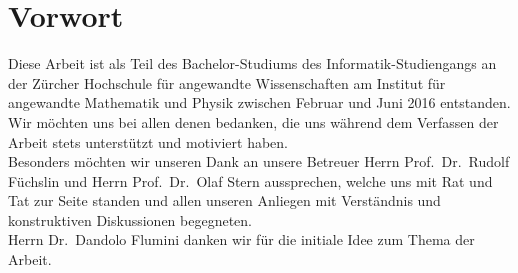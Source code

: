 %
%


\chapter{Vorwort}

  Diese Arbeit ist als Teil des Bachelor-Studiums des Informatik-Studiengangs
  an der Zürcher Hochschule für angewandte Wissenschaften am
  Institut für angewandte Mathematik und Physik zwischen Februar und Juni 2016 entstanden.
  \\
  Wir möchten uns bei allen denen bedanken, die uns während dem Verfassen der Arbeit
  stets unterstützt und motiviert haben.
  \\
  Besonders möchten wir unseren Dank an unsere Betreuer Herrn Prof.\ Dr.\ Rudolf Füchslin und
  Herrn Prof.\ Dr.\ Olaf Stern aussprechen, welche uns mit Rat und Tat zur Seite standen und allen
  unseren Anliegen mit Verständnis und konstruktiven Diskussionen begegneten.
  \\
  Herrn Dr.\ Dandolo Flumini danken wir für die initiale Idee zum Thema der Arbeit.
